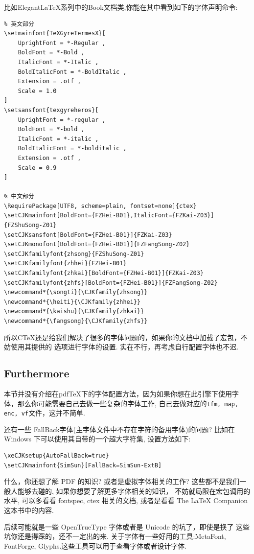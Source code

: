 比如Elegant\LaTeX{}系列中的Book文档类,你能在其中看到如下的字体声明命令:
\begin{verbatim}
% 英文部分
\setmainfont{TeXGyreTermesX}[
    UprightFont = *-Regular ,
    BoldFont = *-Bold ,
    ItalicFont = *-Italic ,
    BoldItalicFont = *-BoldItalic ,
    Extension = .otf ,
    Scale = 1.0
]
\setsansfont{texgyreheros}[
    UprightFont = *-regular ,
    BoldFont = *-bold ,
    ItalicFont = *-italic ,
    BoldItalicFont = *-bolditalic ,
    Extension = .otf ,
    Scale = 0.9
]

% 中文部分
\RequirePackage[UTF8, scheme=plain, fontset=none]{ctex}
\setCJKmainfont[BoldFont={FZHei-B01},ItalicFont={FZKai-Z03}]{FZShuSong-Z01}
\setCJKsansfont[BoldFont={FZHei-B01}]{FZKai-Z03}
\setCJKmonofont[BoldFont={FZHei-B01}]{FZFangSong-Z02}
\setCJKfamilyfont{zhsong}{FZShuSong-Z01}
\setCJKfamilyfont{zhhei}{FZHei-B01}
\setCJKfamilyfont{zhkai}[BoldFont={FZHei-B01}]{FZKai-Z03}
\setCJKfamilyfont{zhfs}[BoldFont={FZHei-B01}]{FZFangSong-Z02}
\newcommand*{\songti}{\CJKfamily{zhsong}}
\newcommand*{\heiti}{\CJKfamily{zhhei}}
\newcommand*{\kaishu}{\CJKfamily{zhkai}}
\newcommand*{\fangsong}{\CJKfamily{zhfs}}
\end{verbatim}

所以C\TeX{}还是给我们解决了很多的字体问题的，如果你的文档中加载了宏包，不妨使用其提供的
选项进行字体的设置. 实在不行，再考虑自行配置字体也不迟.

\subsection{Furthermore}
本节并没有介绍在pdf\TeX{}下的字体配置方法，因为如果你想在此引擎下使用字体，那么你可能需要自己去做一些复杂的字体工作,
自己去做对应的\texttt{tfm, map, enc, vf}文件，这并不简单. 

还有一些 FallBack字体(主字体文件中不存在字符的备用字体)的问题? 比如在 Windows 下可以使用其自带的一个超大字符集,
设置方法如下:
\begin{verbatim}
\xeCJKsetup{AutoFallBack=true}
\setCJKmainfont{SimSun}[FallBack=SimSun-ExtB]
\end{verbatim}

什么，你还想了解 PDF 的知识? 或者是虚拟字体相关的工作? 这些都不是我们一般人能够去碰的, 如果你想要了解更多字体相关的知识，
不妨就局限在宏包调用的水平, 可以多看看 {fontspec, ctex} 相关的文档, 或者是看看 {The \LaTeX{} Companion} 这本书中的内容.

后续可能就是一些 OpenTrueType 字体或者是 Unicode 的坑了，即使是换了  这些坑你还是得踩的，还不一定出的来. 
关于字体有一些好用的工具:MetaFont, FontForge, Glyphs.这些工具可以用于查看字体或者设计字体.

